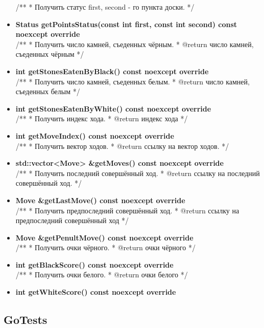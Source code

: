 \begin{itemize}
  /**
   * Получить статус first, second - го пункта доски.
   */
\item\textbf{Status getPointsStatus(const int first, const int second) const noexcept override}\\

  /**
   * Получить число камней, съеденных чёрным.
   * @return число камней, съеденных чёрным
   */
\item\textbf{int getStonesEatenByBlack() const noexcept override}\\

  /**
   * Получить число камней, съеденных белым.
   * @return число камней, съеденных белым
   */
\item\textbf{int getStonesEatenByWhite() const noexcept override}\\

  /**
   * Получить индекс хода.
   * @return индекс хода
   */
\item\textbf{int getMoveIndex() const noexcept override}\\

  /**
   * Получить вектор ходов.
   * @return ссылку на вектор ходов.
   */
\item\textbf{std::vector<Move> \&getMoves() const noexcept override}\\

  /**
   * Получить последний совершённый ход.
   * @return ссылку на последний совершённый ход.
   */
\item\textbf{Move \&getLastMove() const noexcept override}\\

  /**
   * Получить предпоследний совершённый ход.
   * @return ссылку на предпоследний совершённый ход
   */
\item\textbf{Move \&getPenultMove() const noexcept override}\\

  /**
   * Получить очки чёрного.
   * @return очки чёрного
   */
\item\textbf{int getBlackScore() const noexcept override}\\

  /**
   * Получить очки белого.
   * @return очки белого
   */
\item\textbf{int getWhiteScore() const noexcept override}\\	

\end{itemize}

\subsection*{GoTests}

